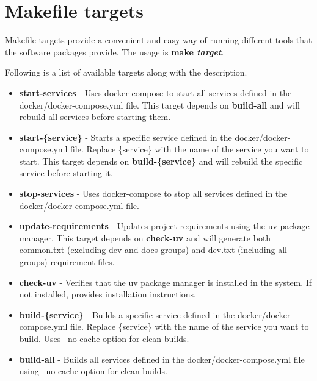 \section{Makefile targets}
\label{sec:makefile_targets}
    Makefile targets provide a convenient and easy way of running different tools that the software packages provide. The usage is \textbf{make \textit{target}}.

    Following is a list of available targets along with the description.

\begin{itemize}
    \item \textbf{start-services}
    - Uses docker-compose to start all services defined in the docker/docker-compose.yml file. This target depends on \textbf{build-all} and will rebuild all services before starting them.

    \item \textbf{start-\{service\}}
    - Starts a specific service defined in the docker/docker-compose.yml file. Replace \{service\} with the name of the service you want to start. This target depends on \textbf{build-\{service\}} and will rebuild the specific service before starting it.

    \item \textbf{stop-services}
    - Uses docker-compose to stop all services defined in the docker/docker-compose.yml file.

    \item \textbf{update-requirements}
    - Updates project requirements using the uv package manager. This target depends on \textbf{check-uv} and will generate both common.txt (excluding dev and docs groups) and dev.txt (including all groups) requirement files.

    \item \textbf{check-uv}
    - Verifies that the uv package manager is installed in the system. If not installed, provides installation instructions.

    \item \textbf{build-\{service\}}
    - Builds a specific service defined in the docker/docker-compose.yml file. Replace \{service\} with the name of the service you want to build. Uses --no-cache option for clean builds.

    \item \textbf{build-all}
    - Builds all services defined in the docker/docker-compose.yml file using --no-cache option for clean builds.
\end{itemize}